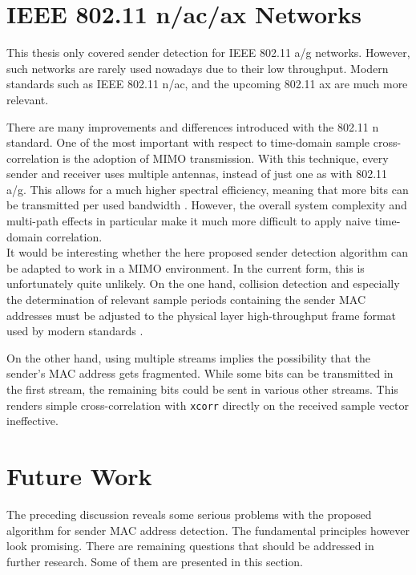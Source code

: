 
\section{IEEE 802.11 n/ac/ax Networks}\label{sec:mimo}

This thesis only covered sender detection for IEEE 802.11 a/g networks. However, such networks are rarely used nowadays due to their low throughput. Modern standards such as IEEE 802.11 n/ac, and the upcoming 802.11 ax are much more relevant.

There are many improvements and differences introduced with the 802.11 n standard. One of the most important with respect to time-domain sample cross-correlation is the adoption of \gls{MIMO} transmission. With this technique, every sender and receiver uses multiple antennas, instead of just one as with 802.11 a/g. This allows for a much higher spectral efficiency, meaning that more bits can be transmitted per used bandwidth \cite{perahia2013}. However, the overall system complexity and multi-path effects in particular make it much more difficult to apply naive time-domain correlation.\\

It would be interesting whether the here proposed sender detection algorithm can be adapted to work in a \gls{MIMO} environment. In the current form, this is unfortunately quite unlikely. On the one hand, collision detection and especially the determination of relevant sample periods containing the sender \gls{MAC} addresses must be adjusted to the physical layer high-throughput frame format used by modern standards \cite{ieee2012}.

On the other hand, using multiple streams implies the possibility that the sender's \gls{MAC} address gets fragmented. While some bits can be transmitted in the first stream, the remaining bits could be sent in various other streams. This renders simple cross-correlation with \texttt{xcorr} directly on the received sample vector ineffective.



\section{Future Work}

The preceding discussion reveals some serious problems with the proposed algorithm for sender \gls{MAC} address detection. The fundamental principles however look promising. There are remaining questions that should be addressed in further research. Some of them are presented in this section.\\

